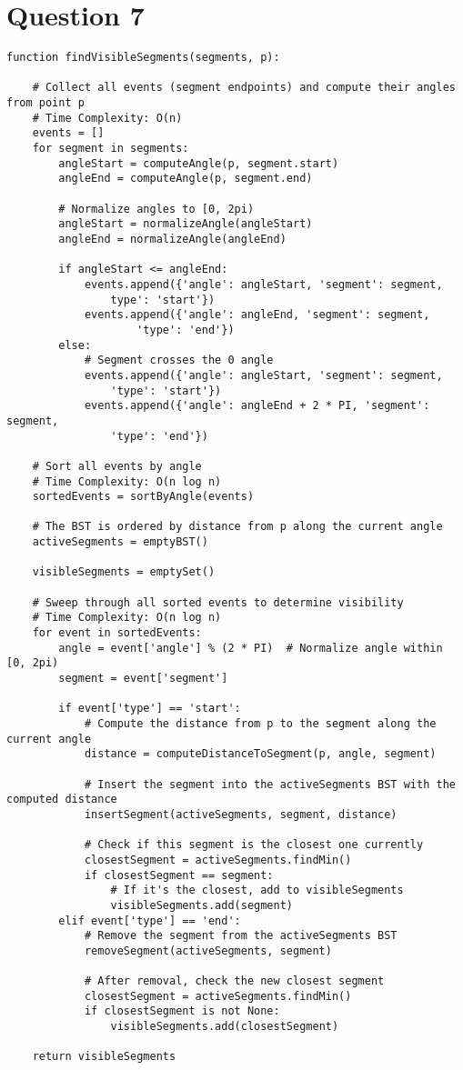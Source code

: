\documentclass{article}
\begin{document}
\section*{Question 7}

\begin{verbatim}
function findVisibleSegments(segments, p):

    # Collect all events (segment endpoints) and compute their angles from point p
    # Time Complexity: O(n)
    events = []
    for segment in segments:
        angleStart = computeAngle(p, segment.start)
        angleEnd = computeAngle(p, segment.end)

        # Normalize angles to [0, 2pi)
        angleStart = normalizeAngle(angleStart)
        angleEnd = normalizeAngle(angleEnd)

        if angleStart <= angleEnd:
            events.append({'angle': angleStart, 'segment': segment, 
                type': 'start'})
            events.append({'angle': angleEnd, 'segment': segment, 
                    'type': 'end'})
        else:
            # Segment crosses the 0 angle
            events.append({'angle': angleStart, 'segment': segment, 
                'type': 'start'})
            events.append({'angle': angleEnd + 2 * PI, 'segment': segment, 
                'type': 'end'})

    # Sort all events by angle
    # Time Complexity: O(n log n)
    sortedEvents = sortByAngle(events)

    # The BST is ordered by distance from p along the current angle
    activeSegments = emptyBST()

    visibleSegments = emptySet()

    # Sweep through all sorted events to determine visibility
    # Time Complexity: O(n log n)
    for event in sortedEvents:
        angle = event['angle'] % (2 * PI)  # Normalize angle within [0, 2pi)
        segment = event['segment']

        if event['type'] == 'start':
            # Compute the distance from p to the segment along the current angle
            distance = computeDistanceToSegment(p, angle, segment)
            
            # Insert the segment into the activeSegments BST with the computed distance
            insertSegment(activeSegments, segment, distance)
            
            # Check if this segment is the closest one currently
            closestSegment = activeSegments.findMin()
            if closestSegment == segment:
                # If it's the closest, add to visibleSegments
                visibleSegments.add(segment)
        elif event['type'] == 'end':
            # Remove the segment from the activeSegments BST
            removeSegment(activeSegments, segment)
            
            # After removal, check the new closest segment
            closestSegment = activeSegments.findMin()
            if closestSegment is not None:
                visibleSegments.add(closestSegment)

    return visibleSegments
\end{verbatim}
\end{document}
